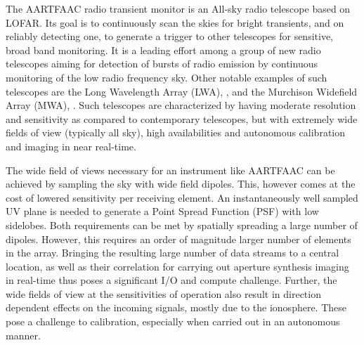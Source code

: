 \documentclass{ws-jai}
\begin{document}


The AARTFAAC  radio transient  monitor is  an All-sky  radio telescope  based on
LOFAR. Its goal is to continuously scan  the skies for bright transients, and on
reliably detecting one, to generate a trigger to other telescopes for sensitive,
broad  band monitoring.   It is  a leading  effort among  a group  of new  radio
telescopes  aiming for  detection  of  bursts of  radio  emission by  continuous
monitoring  of the  low  radio frequency  sky. Other  notable  examples of  such
telescopes are  the Long Wavelength  Array (LWA), \cite{ellingsonLWA1},  and the
Murchison Widefield  Array (MWA), \cite {tingay2013murchison}.   Such telescopes
are characterized by  having moderate resolution and sensitivity  as compared to
contemporary telescopes, but  with extremely wide fields of  view (typically all
sky),  high  availabilities  and  autonomous calibration  and  imaging  in  near
real-time.

The  wide field  of  views necessary  for  an instrument  like  AARTFAAC can  be
achieved by sampling the sky with wide field dipoles. This, however comes at the
cost  of lowered  sensitivity per  receiving element.   An instantaneously  well
sampled UV plane  is needed to generate  a Point Spread Function  (PSF) with low
sidelobes.  Both requirements  can be met by spatially spreading  a large number
of dipoles.  However, this requires  an  order of  magnitude  larger  number  of
elements in the array.  Bringing the resulting large number of data streams to a
central  location,  as well  as  their  correlation  for carrying  out  aperture
synthesis  imaging  in  real-time  thus  poses a  significant  I/O  and  compute
challenge. Further,  the wide fields of  view at the sensitivities  of operation
also result in  direction dependent effects on the incoming  signals, mostly due
to  the ionosphere.  These  pose  a challenge  to  calibration, especially  when
carried out in an autonomous manner.
\end{document}
